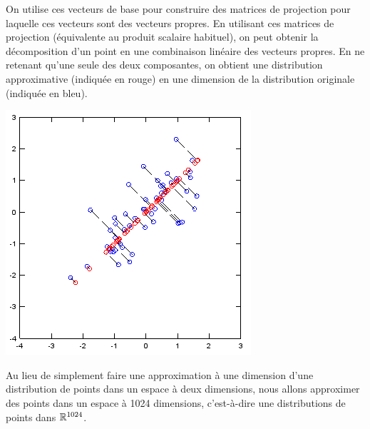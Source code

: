 \begin{adjmulticols}{1}{0in}{-2in}
\begin{center}
\begin{minipage}{0.9\textwidth}
On utilise ces vecteurs de base pour construire des matrices de projection
pour laquelle ces vecteurs sont des vecteurs propres.  En utilisant ces
matrices de projection (équivalente au produit scalaire habituel), on peut
obtenir la décomposition d'un point en une combinaison linéaire des vecteurs
propres. En ne retenant qu'une seule des deux composantes, on obtient
une distribution approximative (indiquée en rouge) en une dimension de la distribution
originale (indiquée en bleu).  
\end{minipage}
\hfill
\begin{minipage}{0.45\textwidth}
\includegraphics[width=\linewidth]{./images/pca_points3}
\end{minipage}
\end{center}

\end{adjmulticols}

Au lieu de simplement faire une approximation à une dimension d'une distribution de points
dans un espace à deux dimensions, nous allons approximer des points dans un espace
à 1024 dimensions, c'est-à-dire une distributions
de points dans $\mathbb{R}^{1024}$.



